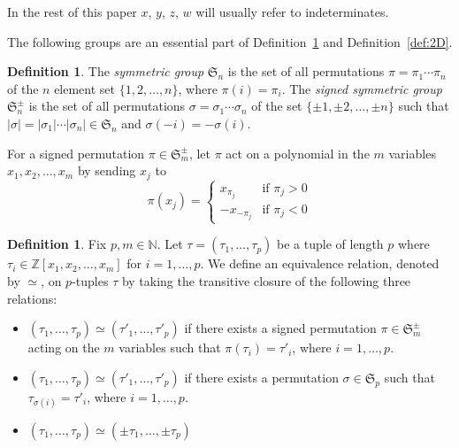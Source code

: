 \documentclass[12pt,table]{article}
\theoremstyle{definition}
\newtheorem{definition}[theorem]{Definition}
\theoremstyle{remark}
\newcommand{\Nnn}{\mathbb N}
\newcommand{\Zzz}{\mathbb Z}
\numberwithin{equation}{section}
\begin{document}
In the rest of this paper $x$, $y$, $z$, $w$ will
usually refer to indeterminates.



The following groups are an essential part of Definition~\ref{def:general}
and Definition~\ref{def:2D}.
\begin{definition}
The {\em symmetric group} $ \mathfrak{S}_n $ is the 
set of all permutations $ \pi = \pi_1 \cdots \pi_n $ 
of the $ n $ element set $ \{ 1, 2, \ldots, n \} $,
where $ \pi(i) = \pi_i $.
The {\em signed symmetric group} $ \mathfrak{S}_n^\pm $
is the set of all permutations $ \sigma = \sigma_1 \cdots \sigma_n$
of the set $ \{ \pm 1, \pm 2, \ldots, \pm n \} $ such that
$ | \sigma | = | \sigma_1 | \cdots |\sigma_n| \in \mathfrak{S}_n $
and $ \sigma(-i) =  -\sigma(i) $.   
\end{definition}



For a signed permutation $ \pi \in \mathfrak{S}_m^\pm $,
let $ \pi $ act on a polynomial in the 
$m$ variables $ x_1,x_2, \ldots, x_m $ by sending $ x_j $ to 
\[
\pi(x_j) =
\begin{cases}
x_{\pi_j} & \text{if } \pi_j > 0 \\
-x_{-\pi_j} & \text{if } \pi_j < 0
\end{cases}
\]

\begin{definition}
\label{def:general}
Fix $ p, m \in \Nnn $. 
Let $ \tau = ( \tau_1, \ldots, \tau_p) $
be a tuple of length $ p $ where 
$ \tau_i \in \Zzz[x_1,x_2, \ldots, x_m] $ for $ i = 1, \ldots, p $.
We define an equivalence relation, denoted by $ \simeq $, on $p$-tuples
$ \tau $ 
by taking the transitive closure of the following three relations:
\begin{itemize}
\item
$ ( \tau_1, \ldots, \tau_p) \simeq ( \tau'_1, \ldots, \tau'_p) $
if there exists a signed permutation $ \pi \in \mathfrak{S}_m^\pm $
acting on the $ m $ variables such that $ \pi( \tau_i ) = \tau'_i $,
 where $ i = 1, \ldots, p $.
\item
$ ( \tau_1, \ldots, \tau_p) \simeq ( \tau'_1, \ldots, \tau'_p) $
if there exists a permutation $ \sigma \in \mathfrak{S}_p $
such that $ \tau_{\sigma(i)} = \tau'_i $, where $ i = 1, \ldots, p $.
\item
$ ( \tau_1, \ldots, \tau_p) \simeq ( \pm \tau_1, \ldots, \pm \tau_p) $
\end{itemize}
\end{definition}
\end{document}
